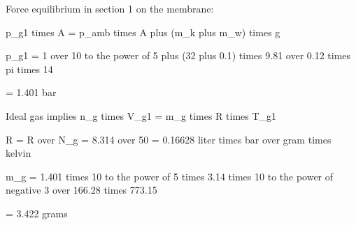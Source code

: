 Force equilibrium in section 1 on the membrane:

p_g1 times A = p_amb times A plus (m_k plus m_w) times g

p_g1 = 1 over 10 to the power of 5 plus (32 plus 0.1) times 9.81 over 0.12 times pi times 14

= 1.401 bar

Ideal gas implies n_g times V_g1 = m_g times R times T_g1

R = R over N_g = 8.314 over 50 = 0.16628 liter times bar over gram times kelvin

m_g = 1.401 times 10 to the power of 5 times 3.14 times 10 to the power of negative 3 over 166.28 times 773.15

= 3.422 grams